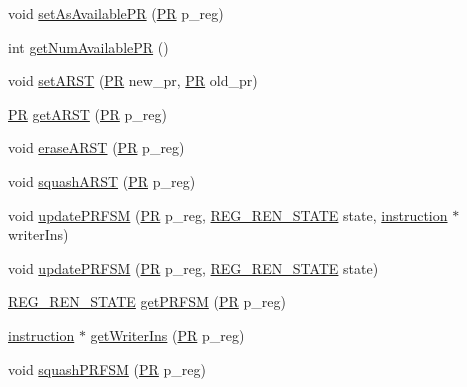 \begin{DoxyCompactItemize}
\item 
void \hyperlink{classregisterRename_a897a4855df90b6dbd2b44a96a48b1a9e}{setAsAvailablePR} (\hyperlink{global_2global_8h_a54dcae2ba04c76c12afe113b706bd4dc}{PR} p\_\-reg)
\item 
int \hyperlink{classregisterRename_ad878188f50dae0a8f49627cf6e769481}{getNumAvailablePR} ()
\item 
void \hyperlink{classregisterRename_a50c7682df34d06395b71032f82492b94}{setARST} (\hyperlink{global_2global_8h_a54dcae2ba04c76c12afe113b706bd4dc}{PR} new\_\-pr, \hyperlink{global_2global_8h_a54dcae2ba04c76c12afe113b706bd4dc}{PR} old\_\-pr)
\item 
\hyperlink{global_2global_8h_a54dcae2ba04c76c12afe113b706bd4dc}{PR} \hyperlink{classregisterRename_aba974402b7e3ff4992f994dc37de0c3d}{getARST} (\hyperlink{global_2global_8h_a54dcae2ba04c76c12afe113b706bd4dc}{PR} p\_\-reg)
\item 
void \hyperlink{classregisterRename_a16058dc91f76a8a53e9a1b26b5aa4d09}{eraseARST} (\hyperlink{global_2global_8h_a54dcae2ba04c76c12afe113b706bd4dc}{PR} p\_\-reg)
\item 
void \hyperlink{classregisterRename_ae1d746f5735c22c34f2f28b194ef1a55}{squashARST} (\hyperlink{global_2global_8h_a54dcae2ba04c76c12afe113b706bd4dc}{PR} p\_\-reg)
\item 
void \hyperlink{classregisterRename_a205b3b75802c8362753e382b46f6f4c5}{updatePRFSM} (\hyperlink{global_2global_8h_a54dcae2ba04c76c12afe113b706bd4dc}{PR} p\_\-reg, \hyperlink{global_2global_8h_aa58e77d5a6caaeed4d4bd6f5b30f3ee7}{REG\_\-REN\_\-STATE} state, \hyperlink{classinstruction}{instruction} $\ast$writerIns)
\item 
void \hyperlink{classregisterRename_ae474a2f30f2db7459192ff2b685d4be5}{updatePRFSM} (\hyperlink{global_2global_8h_a54dcae2ba04c76c12afe113b706bd4dc}{PR} p\_\-reg, \hyperlink{global_2global_8h_aa58e77d5a6caaeed4d4bd6f5b30f3ee7}{REG\_\-REN\_\-STATE} state)
\item 
\hyperlink{global_2global_8h_aa58e77d5a6caaeed4d4bd6f5b30f3ee7}{REG\_\-REN\_\-STATE} \hyperlink{classregisterRename_a50d06999c2233fad684905c741cef0ac}{getPRFSM} (\hyperlink{global_2global_8h_a54dcae2ba04c76c12afe113b706bd4dc}{PR} p\_\-reg)
\item 
\hyperlink{classinstruction}{instruction} $\ast$ \hyperlink{classregisterRename_aa3bd5ef65a4970358775855abbd3f91e}{getWriterIns} (\hyperlink{global_2global_8h_a54dcae2ba04c76c12afe113b706bd4dc}{PR} p\_\-reg)
\item 
void \hyperlink{classregisterRename_aa2e122bca28af9d31425752115a0bceb}{squashPRFSM} (\hyperlink{global_2global_8h_a54dcae2ba04c76c12afe113b706bd4dc}{PR} p\_\-reg)
\end{DoxyCompactItemize}


